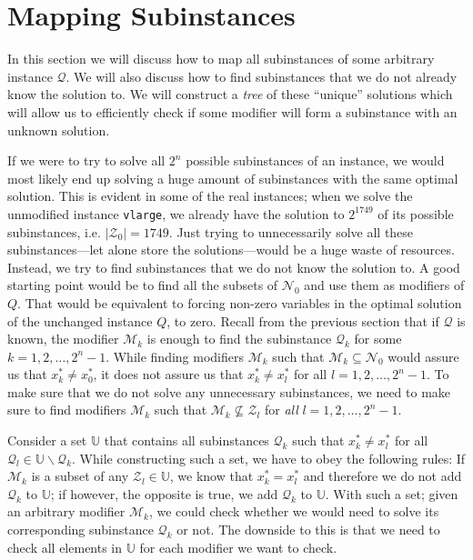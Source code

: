 \section{Mapping Subinstances}
In this section we will discuss how to map all subinstances of some arbitrary
instance $\mathcal{Q}$. We will also discuss how to find 
subinstances that we do not already know the solution to.
We will construct a \emph{tree} of these ``unique'' solutions which will allow
us to efficiently check if some modifier will form a subinstance with an
unknown solution.

If we were to try to solve all $2^n$ possible subinstances of an
instance, we would most likely end up solving a huge amount of subinstances
with the same optimal solution. This is evident in some of the real
instances; when we solve the unmodified instance \texttt{vlarge}, we already
have the solution to $2^{1749}$ of its possible subinstances, i.e.
$|\mathcal{Z}_0| = 1749$.
Just trying to unnecessarily solve all these subinstances---let alone store the
solutions---would be a huge waste of resources.
Instead, we try to find subinstances that we do not know the solution to.
A good starting point would be to find all the subsets of $\mathcal{N}_0$ and
use them as modifiers of $Q$. That would be equivalent to forcing non-zero
variables in the optimal solution of the unchanged instance $Q$, to zero.
Recall from the previous section that if $\mathcal{Q}$ is known, the modifier
$\mathcal{M}_k$ is enough to find the subinstance $\mathcal{Q}_k$ for some
$k=1,2,\ldots,2^n-1$.
While finding modifiers $\mathcal{M}_k$ such that
$\mathcal{M}_k \subseteq \mathcal{N}_0$ would assure us that $x_k^*\neq x_0^*$,
it does not assure us that $x_k^* \neq x_l^*$ for all $l=1,2,\ldots,2^n-1$.
To make sure that we do not solve any unnecessary subinstances, we need to make
sure to find modifiers $\mathcal{M}_k$ such that
$\mathcal{M}_k \not \subseteq \mathcal{Z}_l$
for \emph{all} $l=1,2,\ldots,2^n-1$.

Consider a set $\mathbb{U}$ that contains all subinstances $\mathcal{Q}_k$
such that $x_k^* \neq x_l^*$ for all
$\mathcal{Q}_l \in \mathbb{U} \backslash \mathcal{Q}_k$.
While constructing such a set, we have to obey the following rules:
If $\mathcal{M}_k$ is a subset of any $\mathcal{Z}_l \in \mathbb{U}$, we know
that $x_k^* = x_l^*$ and therefore we do not add $\mathcal{Q}_k$ to
$\mathbb{U}$;
if however, the opposite is true, we add $\mathcal{Q}_k$ to $\mathbb{U}$.
With such a set; given an arbitrary modifier $\mathcal{M}_k$, we could check
whether we would need to solve its corresponding subinstance $\mathcal{Q}_k$ or
not.
The downside to this is that we need to check all elements in $\mathbb{U}$ for
each modifier we want to check.

